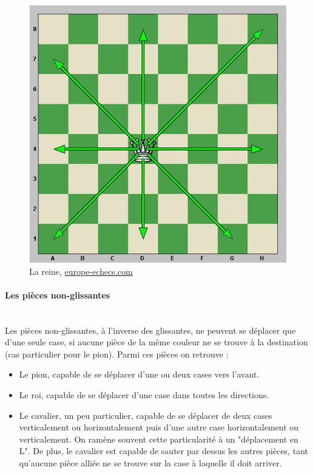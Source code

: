 \huge\documentclass{article}
\begin{document}
\newpage

\begin{figure}[h]
\centering
\includegraphics[scale=0.5]{img/mouvements_reine.jpg}
\caption{La reine,
\href{https://www.europe-echecs.com/art/2-le-deplacement-des-pieces-93.html}{europe-echecs.com}}
\end{figure}

\paragraph{Les pièces non-glissantes}
~~\\
Les pièces non-glissantes, à l'inverse des glissantes, ne peuvent se déplacer que d'une seule case, si aucune pièce de la même couleur ne se trouve à la destination (cas particulier pour le pion). Parmi ces pièces on retrouve :

\begin{itemize}
    \item Le pion, capable de se déplacer d'une ou deux cases vers l'avant.
    \item Le roi, capable de se déplacer d'une case dans toutes les directions.
    \item Le cavalier, un peu particulier, capable de se déplacer de deux cases verticalement ou horizontalement puis d'une autre case horizontalement ou verticalement. On ramène souvent cette particularité à un "déplacement en L". De plus, le cavalier est capable de sauter par dessus les autres pièces, tant qu'aucune pièce alliée ne se trouve sur la case à laquelle il doit arriver.
\end{itemize}
\end{document}
